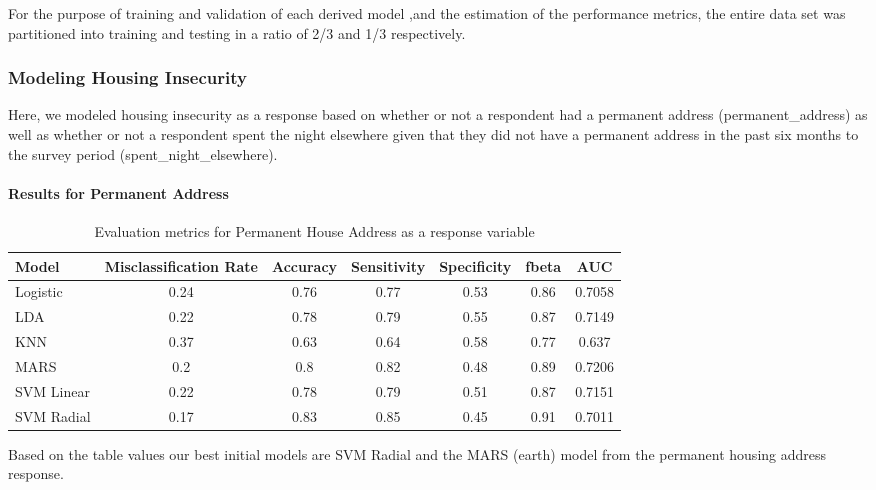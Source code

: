 \documentclass[
  10pt,
]{article}
\begin{document}
For the purpose of training and validation of each derived model ,and the estimation of the performance metrics, the entire data set was partitioned into training and testing in a ratio of 2/3 and 1/3 respectively.

\hypertarget{modeling-housing-insecurity}{%
\subsubsection{Modeling Housing Insecurity}\label{modeling-housing-insecurity}}

Here, we modeled housing insecurity as a response based on whether or not a respondent had a permanent address (permanent\_address) as well as whether or not a respondent spent the night elsewhere given that they did not have a permanent address in the past six months to the survey period (spent\_night\_elsewhere).

\hypertarget{results-for-permanent-address}{%
\paragraph{Results for Permanent Address}\label{results-for-permanent-address}}

\begin{table}[H]

\caption{\label{tab:unnamed-chunk-9}Evaluation metrics for Permanent House Address  as a response variable}
\centering
\fontsize{12}{14}\selectfont
\begin{tabular}[t]{lcccccc}
\toprule
Model & Misclassification Rate & Accuracy & Sensitivity & Specificity & fbeta & AUC\\
\midrule
Logistic & 0.24 & 0.76 & 0.77 & 0.53 & 0.86 & 0.7058\\
LDA & 0.22 & 0.78 & 0.79 & 0.55 & 0.87 & 0.7149\\
KNN & 0.37 & 0.63 & 0.64 & 0.58 & 0.77 & 0.637\\
MARS & 0.2 & 0.8 & 0.82 & 0.48 & 0.89 & 0.7206\\
SVM Linear & 0.22 & 0.78 & 0.79 & 0.51 & 0.87 & 0.7151\\
SVM Radial & 0.17 & 0.83 & 0.85 & 0.45 & 0.91 & 0.7011\\
\bottomrule
\end{tabular}
\end{table}

Based on the table values our best initial models are SVM Radial and the MARS (earth) model from the permanent housing address response.\\
\end{document}
